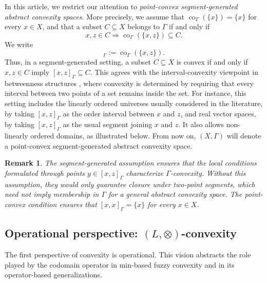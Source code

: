 \documentclass[11pt,a4paper]{article}
\newtheorem{remark}{Remark}
\begin{document}
In this article, we restrict our attention to \emph{point-convex segment-generated abstract convexity spaces}. More precisely, we assume that \(\operatorname{co}_{\Gamma}(\{x\})=\{x\}\) for every \(x\in X\), and that a subset \(C\subseteq X\) belongs to \(\Gamma\) if and only if
\begin{equation*}
x,z\in C \Longrightarrow \operatorname{co}_{\Gamma}(\{x,z\})\subseteq C.
\end{equation*}
We write
\begin{equation*}
[x,z]_{\Gamma}:=\operatorname{co}_{\Gamma}(\{x,z\}).
\end{equation*}
Thus, in a segment-generated setting, a subset \(C\subseteq X\) is convex if and only if \(x,z\in C\) imply \([x,z]_{\Gamma}\subseteq C\). This agrees with the interval-convexity viewpoint in betweenness structures \citep{AndersonBankstonMcCluskey2021}, where convexity is determined by requiring that every interval between two points of a set remains inside the set. For instance, this setting includes the linearly ordered universes usually considered in the literature, by taking \([x,z]_{\Gamma}\) as the order interval between \(x\) and \(z\), and real vector spaces, by taking \([x,z]_{\Gamma}\) as the usual segment joining \(x\) and \(z\). It also allows non-linearly ordered domains, as illustrated below. From now on, \((X,\Gamma)\) will denote a point-convex segment-generated abstract convexity space.




\begin{remark}\label{rem:why-segment-generated}
The segment-generated assumption ensures that the local conditions formulated through points \(y\in[x,z]_{\Gamma}\) characterize \(\Gamma\)-convexity. Without this assumption, they would only guarantee closure under two-point segments, which need not imply membership in \(\Gamma\) for a general abstract convexity space. The point-convex condition ensures that \([x,x]_{\Gamma}=\{x\}\) for every \(x\in X\).
\end{remark}





\subsection{Operational perspective: \((L,\otimes)\)-convexity}

\smallskip

The first perspective of convexity is operational. This vision abstracts the role played by the codomain operator in min-based fuzzy convexity and in its operator-based generalizations.
\end{document}
